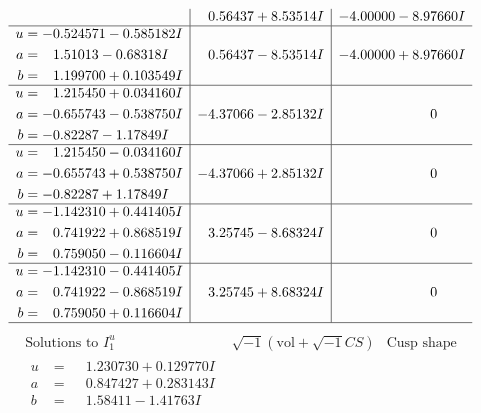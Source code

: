 \documentclass[1p]{elsarticle_modified}
\theoremstyle{definition}
\newcommand{\I}{\sqrt{-1}}
\begin{document}
$$\begin{array}{c|c|c}
 & \phantom{-}0.56437 + 8.53514 I & -4.00000 - 8.97660 I \\ \hline\begin{aligned}
u &= -0.524571 - 0.585182 I \\
a &= \phantom{-}1.51013 - 0.68318 I \\
b &= \phantom{-}1.199700 + 0.103549 I\end{aligned}
 & \phantom{-}0.56437 - 8.53514 I & -4.00000 + 8.97660 I \\ \hline\begin{aligned}
u &= \phantom{-}1.215450 + 0.034160 I \\
a &= -0.655743 - 0.538750 I \\
b &= -0.82287 - 1.17849 I\end{aligned}
 & -4.37066 - 2.85132 I & \phantom{-0.000000 } 0 \\ \hline\begin{aligned}
u &= \phantom{-}1.215450 - 0.034160 I \\
a &= -0.655743 + 0.538750 I \\
b &= -0.82287 + 1.17849 I\end{aligned}
 & -4.37066 + 2.85132 I & \phantom{-0.000000 } 0 \\ \hline\begin{aligned}
u &= -1.142310 + 0.441405 I \\
a &= \phantom{-}0.741922 + 0.868519 I \\
b &= \phantom{-}0.759050 - 0.116604 I\end{aligned}
 & \phantom{-}3.25745 - 8.68324 I & \phantom{-0.000000 } 0 \\ \hline\begin{aligned}
u &= -1.142310 - 0.441405 I \\
a &= \phantom{-}0.741922 - 0.868519 I \\
b &= \phantom{-}0.759050 + 0.116604 I\end{aligned}
 & \phantom{-}3.25745 + 8.68324 I & \phantom{-0.000000 } 0\\
 \hline 
 \end{array}$$\newpage$$\begin{array}{c|c|c}  
\text{Solutions to }I^u_{1}& \I (\text{vol} + \sqrt{-1}CS) & \text{Cusp shape}\\
 \hline 
\begin{aligned}
u &= \phantom{-}1.230730 + 0.129770 I \\
a &= \phantom{-}0.847427 + 0.283143 I \\
b &= \phantom{-}1.58411 - 1.41763 I\end{aligned}

\end{array}$$
\end{document}

